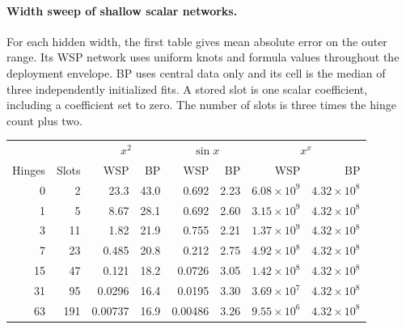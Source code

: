 \paragraph{Width sweep of shallow scalar networks.}
For each hidden width, the first table gives mean absolute error on the outer range. Its WSP network uses uniform knots and formula values throughout the deployment envelope. BP uses central data only and its cell is the median of three independently initialized fits. A stored slot is one scalar coefficient, including a coefficient set to zero. The number of slots is three times the hinge count plus two.
\begin{center}
\begin{minipage}{\linewidth}
\centering
\makeatletter{}\makeatother
\caption{Mean absolute error (MAE) on the outer shell for shallow networks of increasing hidden width. WSP has access to the formula throughout the envelope. BP uses central labels.}\label{tab:initial_mae}
\small
\begin{tabular}{@{}rr|rr|rr|rr@{}}\toprule
& & \multicolumn{2}{c|}{\(x^2\)} & \multicolumn{2}{c|}{\(\sin x\)} & \multicolumn{2}{c}{\(x^x\)}\\
Hinges & Slots & WSP & BP & WSP & BP & WSP & BP \\\midrule
0  & 2   & 23.3 & 43.0 & 0.692 & 2.23 & \(6.08\times 10^9\) & \(4.32\times 10^8\)\\
1  & 5   & 8.67 & 28.1 & 0.692 & 2.60 & \(3.15\times 10^9\) & \(4.32\times 10^8\)\\
3  & 11  & 1.82 & 21.9 & 0.755 & 2.21 & \(1.37\times 10^9\) & \(4.32\times 10^8\)\\
7  & 23  & 0.485 & 20.8 & 0.212 & 2.75 & \(4.92\times 10^8\) & \(4.32\times 10^8\)\\
15 & 47  & 0.121 & 18.2 & 0.0726 & 3.05 & \(1.42\times 10^8\) & \(4.32\times 10^8\)\\
31 & 95  & 0.0296 & 16.4 & 0.0195 & 3.30 & \(3.69\times 10^7\) & \(4.32\times 10^8\)\\
63 & 191 & 0.00737 & 16.9 & 0.00486 & 3.26 & \(9.55\times 10^6\) & \(4.32\times 10^8\)\\\bottomrule
\end{tabular}
\end{minipage}
\end{center}

